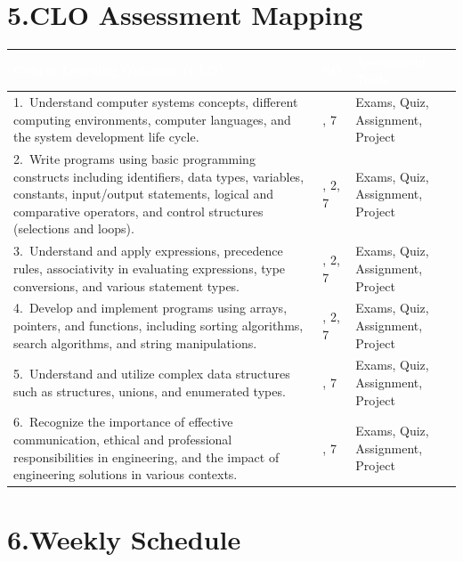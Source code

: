 \documentclass[11pt,a4paper]{article}
\begin{document}
\section*{5.\quad CLO Assessment Mapping}
\renewcommand{\arraystretch}{1.3}
\begin{tabularx}{\linewidth}{X >{\centering\arraybackslash}p{2.0cm} >{\centering\arraybackslash}p{4.4cm}}
  \toprule
  \rowcolor{kmutnbBlue!90}
  \textcolor{white}{\textbf{Course Learning Outcome (CLO)}} &
  \textcolor{white}{\textbf{SO}} &
  \textcolor{white}{\textbf{Assessment Tools}} \\
  \midrule
  1.\ Understand computer systems concepts, different computing environments,
      computer languages, and the system development life cycle.
  & 1, 7 & Exams, Quiz, Assignment, Project \\
  \rowcolor{lightGray}
  2.\ Write programs using basic programming constructs including identifiers,
      data types, variables, constants, input/output statements, logical and
      comparative operators, and control structures (selections and loops).
  & 1, 2, 7 & Exams, Quiz, Assignment, Project \\
  3.\ Understand and apply expressions, precedence rules, associativity in
      evaluating expressions, type conversions, and various statement types.
  & 1, 2, 7 & Exams, Quiz, Assignment, Project \\
  \rowcolor{lightGray}
  4.\ Develop and implement programs using arrays, pointers, and functions,
      including sorting algorithms, search algorithms, and string manipulations.
  & 1, 2, 7 & Exams, Quiz, Assignment, Project \\
  5.\ Understand and utilize complex data structures such as structures, unions,
      and enumerated types.
  & 1, 7 & Exams, Quiz, Assignment, Project \\
  \rowcolor{lightGray}
  6.\ Recognize the importance of effective communication, ethical and
      professional responsibilities in engineering, and the impact of engineering
      solutions in various contexts.
  & 1, 7 & Exams, Quiz, Assignment, Project \\
  \bottomrule
\end{tabularx}

\section*{6.\quad Weekly Schedule}
\end{document}
